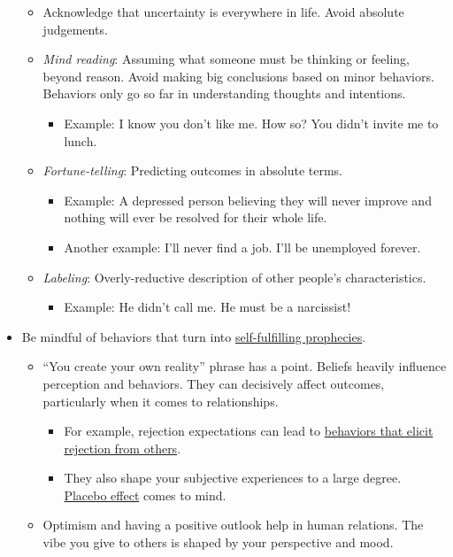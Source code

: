 \documentclass[
]{book}
\providecommand{\tightlist}{%
  \setlength{\itemsep}{0pt}\setlength{\parskip}{0pt}}
\begin{document}
\begin{itemize}
  \begin{itemize}
  \tightlist
  \item
    Acknowledge that uncertainty is everywhere in life. Avoid absolute judgements.
  \item
    \emph{Mind reading}: Assuming what someone must be thinking or feeling, beyond reason. Avoid making big conclusions based on minor behaviors. Behaviors only go so far in understanding thoughts and intentions.

    \begin{itemize}
    \tightlist
    \item
      Example: I know you don't like me. How so? You didn't invite me to lunch.
    \end{itemize}
  \item
    \emph{Fortune-telling}: Predicting outcomes in absolute terms.

    \begin{itemize}
    \tightlist
    \item
      Example: A depressed person believing they will never improve and nothing will ever be resolved for their whole life.
    \item
      Another example: I'll never find a job. I'll be unemployed forever.
    \end{itemize}
  \item
    \emph{Labeling}: Overly-reductive description of other people's characteristics.

    \begin{itemize}
    \tightlist
    \item
      Example: He didn't call me. He must be a narcissist!
    \end{itemize}
  \end{itemize}
\item
  Be mindful of behaviors that turn into \href{https://en.wikipedia.org/wiki/Self-fulfilling_prophecy}{self-fulfilling prophecies}.

  \begin{itemize}
  \tightlist
  \item
    ``You create your own reality'' phrase has a point. Beliefs heavily influence perception and behaviors. They can decisively affect outcomes, particularly when it comes to relationships.

    \begin{itemize}
    \tightlist
    \item
      For example, rejection expectations can lead to \href{https://doi.org/10.1037/0022-3514.75.2.545}{behaviors that elicit rejection from others}.
    \item
      They also shape your subjective experiences to a large degree. \href{https://en.wikipedia.org/wiki/Placebo\#Effects}{Placebo effect} comes to mind.
    \end{itemize}
  \item
    Optimism and having a positive outlook help in human relations. The vibe you give to others is shaped by your perspective and mood.


\end{itemize}
\end{itemize}
\end{document}
